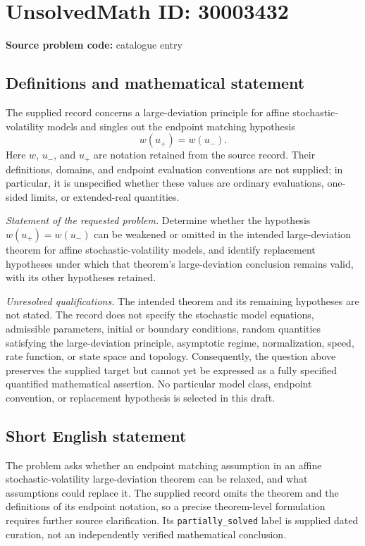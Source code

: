 \documentclass[11pt]{article}
\begin{document}
\section*{UnsolvedMath ID: 30003432}
\textbf{Source problem code:} catalogue entry
\subsection{Definitions and mathematical statement}
The supplied record concerns a large-deviation principle for affine stochastic-volatility models and singles out the endpoint matching hypothesis
\[
 w(u_+)=w(u_-).
\]
Here \(w\), \(u_-\), and \(u_+\) are notation retained from the source record. Their definitions, domains, and endpoint evaluation conventions are not supplied; in particular, it is unspecified whether these values are ordinary evaluations, one-sided limits, or extended-real quantities.

\emph{Statement of the requested problem.} Determine whether the hypothesis \(w(u_+)=w(u_-)\) can be weakened or omitted in the intended large-deviation theorem for affine stochastic-volatility models, and identify replacement hypotheses under which that theorem's large-deviation conclusion remains valid, with its other hypotheses retained.

\emph{Unresolved qualifications.} The intended theorem and its remaining hypotheses are not stated. The record does not specify the stochastic model equations, admissible parameters, initial or boundary conditions, random quantities satisfying the large-deviation principle, asymptotic regime, normalization, speed, rate function, or state space and topology. Consequently, the question above preserves the supplied target but cannot yet be expressed as a fully specified quantified mathematical assertion. No particular model class, endpoint convention, or replacement hypothesis is selected in this draft.
\subsection{Short English statement}
The problem asks whether an endpoint matching assumption in an affine stochastic-volatility large-deviation theorem can be relaxed, and what assumptions could replace it. The supplied record omits the theorem and the definitions of its endpoint notation, so a precise theorem-level formulation requires further source clarification. Its \texttt{partially\_solved} label is supplied dated curation, not an independently verified mathematical conclusion.
\end{document}
